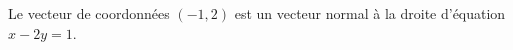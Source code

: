 Le vecteur de coordonnées $(-1,2)$ est un vecteur normal à la droite d'équation $x-2y=1$.

\begin{reponses}
\end{reponses}

